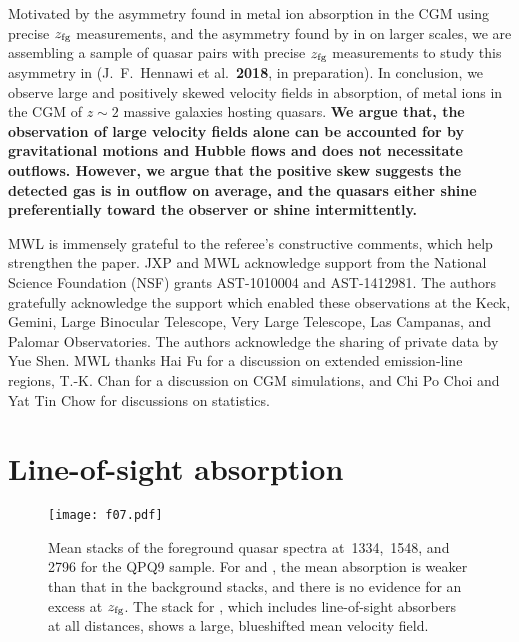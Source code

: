 \documentclass[iop]{emulateapj}
\begin{document}
Motivated by the asymmetry found in metal ion absorption in the CGM using precise $z_{\rm fg}$
measurements, and the asymmetry found by \cite{KirkmanTytler08} in  on larger
scales, we are assembling a sample of quasar pairs with precise $z_{\rm fg}$ measurements to study
this asymmetry in  (J.\ F.\ Hennawi et al.\ {\bf 2018}, in preparation). In conclusion, we
observe large and positively skewed velocity fields in absorption, of metal ions
in the CGM of $z\sim2$ massive galaxies hosting quasars.
{\bf We argue that, the observation of large velocity fields alone can be accounted for by
gravitational motions and Hubble flows and does not necessitate outflows. However, we argue that the
positive skew suggests the detected gas is in outflow on average, and the quasars either shine
preferentially toward the observer or shine intermittently.}

\acknowledgements
MWL is immensely grateful to the referee's constructive comments, which help strengthen the
paper.
JXP and MWL acknowledge support from the National Science Foundation (NSF) grants AST-1010004 and
AST-1412981. The authors gratefully acknowledge the support which enabled these observations at
the Keck, Gemini, Large Binocular Telescope, Very Large Telescope, Las Campanas, and Palomar
Observatories. The authors acknowledge the sharing of private data by Yue Shen. MWL thanks Hai Fu
for a discussion on extended emission-line regions, T.-K. Chan for a discussion on CGM
simulations, and Chi Po Choi and Yat Tin Chow for discussions on statistics.

\appendix

\section{Line-of-sight absorption}
\label{sec:appendix}

\begin{figure}
\texttt{[image: f07.pdf]}
\caption{Mean stacks of the foreground quasar spectra at \,1334, \,1548, and
\,2796 for the QPQ9 sample. For  and , the mean absorption is
weaker than that in the background stacks, and there is no evidence for an excess at $z_{\rm fg}$.
The stack for , which includes line-of-sight absorbers at all distances, shows a large,
blueshifted mean velocity field.
}
\label{fig:stacks_fg}
\end{figure}
\end{document}
